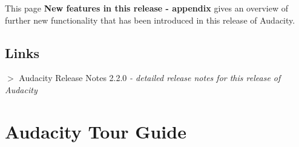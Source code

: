 \documentclass[twocolumn]{book}
\begin{document}
This page \textbf{New features in this release - appendix} gives an overview of further new functionality that has been introduced in this release of Audacity.



\section{Links}


\textbf{\mbox{$>$}} Audacity Release Notes 2.2.0 \textit{- detailed release notes for this release of Audacity}



%  
% 
%  
% 
%  

											
																					
\chapter{Audacity Tour Guide}


\label{f42}																																	%
					
\end{document}
